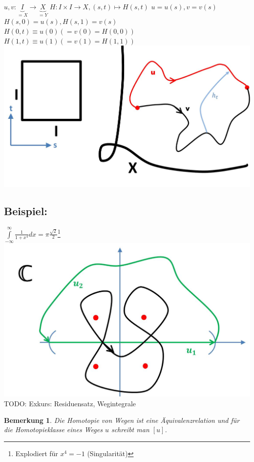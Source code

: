 \documentclass[a4paper,11pt,notitlepage]{report}
\newtheorem{remark}{Bemerkung}[chapter]
\newenvironment{bsp}[1]
{
\setlength{\fboxsep}{10pt}
\subsection*{Beispiel: #1}
\begin{upshape}
}
{
\end{upshape}
}
\begin{document}
$u,v \colon \underbrace{I}_{= X} \rightarrow \underbrace{X}_{=Y}$ \newline
$H \colon I \times I \rightarrow X, (s,t) \mapsto H(s,t)$ \newline
$u = u(s), v= v(s)$ \newline
$H(s,0) = u(s), H(s,1)=v(s)$ \newline
$H(0,t) \equiv u(0) (=v(0) = H(0,0))$ \newline
$H(1,t) \equiv u(1) (=v(1) = H(1,1))$ \newline
\includegraphics[scale=0.4]{images/Homotopie_Menge_von_Wegen.jpg}

\begin{bsp}{}
	$\int\limits_{-\infty}^{\infty}{\frac{1}{1+x^4} dx} = \pi \frac{\sqrt{2}}{2}$\footnote{Explodiert für $x^4 = -1$ (Singularität)}
	\includegraphics[scale=0.4]{images/Residuensatz.jpg}
	\newline
	TODO: Exkurs: Residuensatz, Wegintegrale
\end{bsp}

\begin{remark}{}
	Die Homotopie von Wegen ist eine Äquivalenzrelation und für die Homotopieklasse eines Weges $u$ schreibt man $[u]$.
\end{remark}
\end{document}
